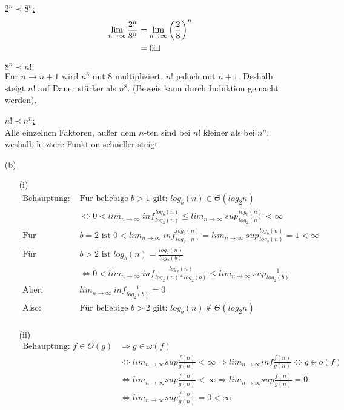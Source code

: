 \documentclass{article}
\begin{document}
\begin{enumerate}
\underline{$2^n \prec 8^n$:} \\
\begin{align*}
    \lim_{n \to \infty} \frac{2^n}{8^n} &= \lim_{n \to \infty}
        \left( \frac{2}{8} \right)^n \\
        &= 0 \hfill \square
\end{align*}

\underline{$8^n \prec n!:$} \\
Für $n \to n+1$ wird $n^8$ mit 8 multipliziert, $n!$ jedoch mit $n+1$. Deshalb
steigt $n!$ auf Dauer stärker als $n^8$. (Beweis kann durch Induktion gemacht
werden).

\underline{$n! \prec n^n$:} \\
Alle einzelnen Faktoren, außer dem $n$-ten sind bei $n!$ kleiner als bei $n^n$,
weshalb letztere Funktion schneller steigt.

\item[(b)]

\begin{enumerate}
\item[(i)]
	\begin{align*}
	\text{Behauptung: } &\text{Für beliebige } b > 1 \text{ gilt: } log_b(n) \in \Theta(log_2n) \\
	&\Leftrightarrow 0 < lim_{n \rightarrow \infty}~ inf \frac{log_b(n)}{log_2(n)} \le 
		lim_{n \rightarrow \infty}~ sup \frac{log_b(n)}{log_2(n)} < \infty \\
	\text{Für } &b=2 \text{ ist } 0 <  lim_{n \rightarrow \infty}~ inf \frac{log_b(n)}{log_2(n)} 
		= lim_{n \rightarrow \infty}~ sup \frac{log_b(n)}{log_2(n)} = 1 < \infty \\
	\text{Für } &b>2 \text{ ist } log_b(n) = \frac{log_2(n)}{log_2(b)} \\
	&\Leftrightarrow 0 < lim_{n \rightarrow \infty}~ inf \frac{log_2(n)}{log_2(n)*log_2(b)} 
		\le lim_{n \rightarrow \infty}~ sup \frac{1}{log_2(b)} \\
	\text{Aber: } &lim_{n \rightarrow \infty}~ inf \frac{1}{log_2(b)} = 0  \\
	\text{Also: } &\text{Für beliebige } b > 2 \text{ gilt: } log_b(n) \notin \Theta(log_2n) \\   
	\end{align*}

\item[(ii)]
	\begin{align*}
		\text{Behauptung: } f \in O(g) &\Rightarrow g \in \omega(f) \\
		&\Leftrightarrow lim_{n \rightarrow \infty} sup \frac{f(n)}{g(n)} 
			< \infty \Rightarrow lim_{n \rightarrow \infty} inf 
			\frac{f(n)}{g(n)} \Leftrightarrow g \in o(f) \\
		&\Leftrightarrow lim_{n \rightarrow \infty} sup \frac{f(n)}{g(n)} 
			< \infty \Rightarrow lim_{n \rightarrow \infty} sup
                        \frac{f(n)}{g(n)} = 0 \\
		&\Leftrightarrow lim_{n \rightarrow \infty} sup \frac{f(n)}{g(n)} = 0 
			< \infty 
	\end{align*}


\end{enumerate}
\end{enumerate}
\end{document}
